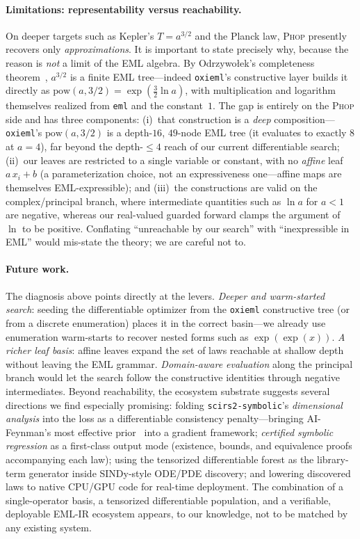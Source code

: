 \documentclass{article}
\begin{document}
\paragraph{Limitations: representability versus reachability.}
On deeper targets such as Kepler's $T=a^{3/2}$ and the Planck law,
\textsc{Phop} presently recovers only \emph{approximations}. It is
important to state precisely why, because the reason is \emph{not} a
limit of the EML algebra. By Odrzywo\l{}ek's completeness
theorem~\cite{odrzywolek2026eml}, $a^{3/2}$ is a finite EML tree---indeed
\texttt{oxieml}'s constructive layer builds it directly as
$\mathrm{pow}(a,3/2)=\exp(\tfrac32\ln a)$, with multiplication and
logarithm themselves realized from \texttt{eml} and the constant~$1$.
The gap is entirely on the \textsc{Phop} side and has three components:
(i)~that construction is a \emph{deep} composition---\texttt{oxieml}'s
$\mathrm{pow}(a,3/2)$ is a depth-$16$, $49$-node EML tree (it evaluates to
exactly $8$ at $a=4$), far beyond the depth-$\le\!4$ reach of our current
differentiable search; (ii)~our leaves are
restricted to a single variable or constant, with no \emph{affine} leaf
$a\,x_i+b$ (a parameterization choice, not an expressiveness one---affine
maps are themselves EML-expressible); and (iii)~the constructions are
valid on the complex/principal branch, where intermediate quantities such
as $\ln a$ for $a<1$ are negative, whereas our real-valued guarded
forward clamps the argument of $\ln$ to be positive. Conflating
``unreachable by our search'' with ``inexpressible in EML'' would
mis-state the theory; we are careful not to.

\paragraph{Future work.}
The diagnosis above points directly at the levers. \emph{Deeper and
warm-started search}: seeding the differentiable optimizer from the
\texttt{oxieml} constructive tree (or from a discrete enumeration) places
it in the correct basin---we already use enumeration warm-starts to
recover nested forms such as $\exp(\exp(x))$. \emph{A richer leaf basis}:
affine leaves expand the set of laws reachable at shallow depth without
leaving the EML grammar. \emph{Domain-aware evaluation} along the
principal branch would let the search follow the constructive identities
through negative intermediates. Beyond reachability, the ecosystem
substrate suggests several directions we find especially promising:
folding \texttt{scirs2-symbolic}'s \emph{dimensional analysis} into the
loss as a differentiable consistency penalty---bringing AI-Feynman's
most effective prior~\cite{udrescu2020aifeynman} into a gradient
framework; \emph{certified symbolic regression} as a first-class output
mode (existence, bounds, and equivalence proofs accompanying each law);
using the tensorized differentiable forest as the library-term generator
inside SINDy-style ODE/PDE discovery; and lowering discovered laws to
native CPU/GPU code for real-time deployment. The combination of a
single-operator basis, a tensorized differentiable population, and a
verifiable, deployable EML-IR ecosystem appears, to our knowledge, not to
be matched by any existing system.
\end{document}
